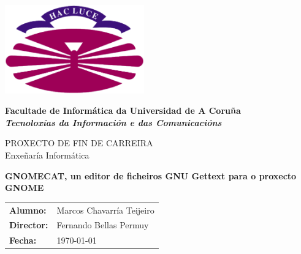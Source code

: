 %
%

%

\begin{titlepage}

	\begin{center}

		\includegraphics[width=6cm]{./eps/logo_udc.eps}
		\vspace{2cm}

		{\Large{\textbf{Facultade de Informática da Universidad de A Coruña}}}
		\\
		{\it \large{\textbf{Tecnoloxías da Información e das Comunicacións}}}
		\vspace{1cm}

		{\large PROXECTO DE FIN DE CARREIRA\\Enxeñaría Informática}
		\vspace{1cm}

		\textbf{\Large GNOMECAT, un editor de ficheiros GNU Gettext para o proxecto GNOME}
		\vspace{7cm}
	\end{center}

	\begin{flushright}
		\begin{tabular}{ll}
			\large{\textbf{Alumno:}}	&
			\large{Marcos Chavarría Teijeiro} \\

			\large{\textbf{Director:}}	&
			\large{Fernando Bellas Permuy} \\

			\large{\textbf{Fecha:}}	&
			\large{\today} \\
		\end{tabular}
	\end{flushright}

\end{titlepage}
